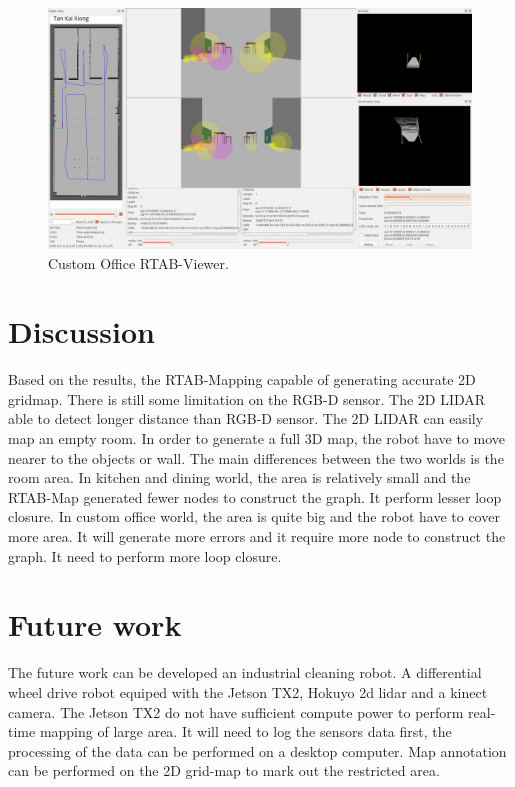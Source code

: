 \documentclass[10pt,journal,compsoc]{IEEEtran}
\begin{document}
\begin{figure}[thpb]
      \centering
      \includegraphics[width=\linewidth]{custom_office_rtabviewer.png}
      \caption{Custom Office RTAB-Viewer.}
      \label{fig:robot10}
\end{figure}

\section{Discussion}
Based on the results, the RTAB-Mapping capable of generating accurate 2D gridmap. There is still some limitation on the RGB-D sensor. The 2D LIDAR able to detect longer distance than RGB-D sensor. The 2D LIDAR can easily map an empty room. In order to generate a full 3D map, the robot have to move nearer to the objects or wall.
The main differences between the two worlds is the room area. In kitchen and dining world, the area is relatively small and the RTAB-Map generated fewer nodes to construct the graph. It perform lesser loop closure. In custom office world, the area is quite big and the robot have to cover more area. It will generate more errors and it require more node to construct the graph. It need to perform more loop closure.

\section{Future work}
The future work can be developed an industrial cleaning robot. A differential wheel drive robot equiped with the Jetson TX2, Hokuyo 2d lidar and a kinect camera. The Jetson TX2 do not have sufficient compute power to perform real-time mapping of large area. It will need to log the sensors data first, the processing of the data can be performed on a desktop computer. Map annotation can be performed on the 2D grid-map to mark out the restricted area. 



\end{document}
